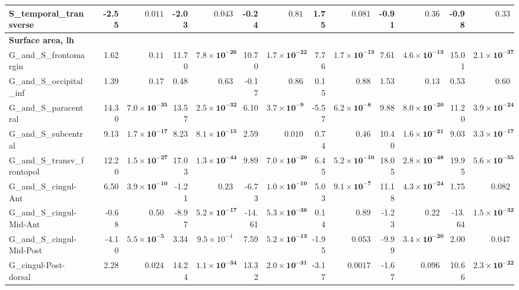 {\begin{longtable}{llrrrrrrrrrrrr}
S\_temporal\_transverse &  & -2.55 & $0.011$ & -2.03 & $0.043$ & -0.24 & $0.81$ & 1.75 & $0.081$ & -0.91 & $0.36$ & -0.98 & $0.33$ \\
\midrule\multicolumn{14}{l}{\textbf{Surface area, lh}} \\
G\_and\_S\_frontomargin &  & 1.62 & $0.11$ & 11.70 & $\mathbf{7.8{\times}10^{-26}}$ & 10.70 & $\mathbf{1.7{\times}10^{-22}}$ & 7.76 & $\mathbf{1.7{\times}10^{-13}}$ & 7.61 & $\mathbf{4.6{\times}10^{-13}}$ & 15.01 & $\mathbf{2.1{\times}10^{-37}}$ \\
G\_and\_S\_occipital\_inf &  & 1.39 & $0.17$ & 0.48 & $0.63$ & -0.17 & $0.86$ & 0.15 & $0.88$ & 1.53 & $0.13$ & 0.53 & $0.60$ \\
G\_and\_S\_paracentral &  & 14.30 & $\mathbf{7.0{\times}10^{-35}}$ & 13.57 & $\mathbf{2.5{\times}10^{-32}}$ & 6.10 & $\mathbf{3.7{\times}10^{-9}}$ & -5.57 & $\mathbf{6.2{\times}10^{-8}}$ & 9.88 & $\mathbf{8.0{\times}10^{-20}}$ & 11.20 & $\mathbf{3.9{\times}10^{-24}}$ \\
G\_and\_S\_subcentral &  & 9.13 & $\mathbf{1.7{\times}10^{-17}}$ & 8.23 & $\mathbf{8.1{\times}10^{-15}}$ & 2.59 & $0.010$ & 0.74 & $0.46$ & 10.40 & $\mathbf{1.6{\times}10^{-21}}$ & 9.03 & $\mathbf{3.3{\times}10^{-17}}$ \\
G\_and\_S\_transv\_frontopol &  & 12.20 & $\mathbf{1.5{\times}10^{-27}}$ & 17.03 & $\mathbf{1.3{\times}10^{-44}}$ & 9.89 & $\mathbf{7.0{\times}10^{-20}}$ & 6.45 & $\mathbf{5.2{\times}10^{-10}}$ & 18.05 & $\mathbf{2.8{\times}10^{-48}}$ & 19.95 & $\mathbf{5.6{\times}10^{-55}}$ \\
G\_and\_S\_cingul-Ant &  & 6.50 & $\mathbf{3.9{\times}10^{-10}}$ & -1.21 & $0.23$ & -6.73 & $\mathbf{1.0{\times}10^{-10}}$ & 5.03 & $\mathbf{9.1{\times}10^{-7}}$ & 11.18 & $\mathbf{4.3{\times}10^{-24}}$ & 1.75 & $0.082$ \\
G\_and\_S\_cingul-Mid-Ant &  & -0.68 & $0.50$ & -8.97 & $\mathbf{5.2{\times}10^{-17}}$ & -14.61 & $\mathbf{5.3{\times}10^{-36}}$ & 0.14 & $0.89$ & -1.23 & $0.22$ & -13.64 & $\mathbf{1.5{\times}10^{-32}}$ \\
G\_and\_S\_cingul-Mid-Post &  & -4.10 & $\mathbf{5.5{\times}10^{-5}}$ & 3.34 & $9.5{\times}10^{-4}$ & 7.59 & $\mathbf{5.2{\times}10^{-13}}$ & -1.95 & $0.053$ & -9.99 & $\mathbf{3.4{\times}10^{-20}}$ & 2.00 & $0.047$ \\
G\_cingul-Post-dorsal &  & 2.28 & $0.024$ & 14.24 & $\mathbf{1.1{\times}10^{-34}}$ & 13.32 & $\mathbf{2.0{\times}10^{-31}}$ & -3.17 & $0.0017$ & -1.67 & $0.096$ & 10.66 & $\mathbf{2.3{\times}10^{-22}}$ \\

\end{longtable}}
